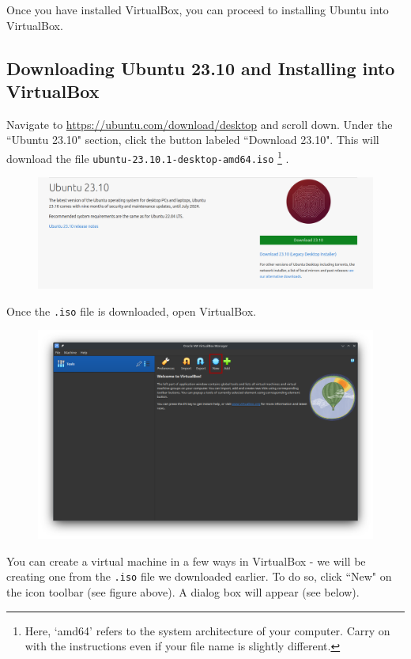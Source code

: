\documentclass[12pt]{article}
\begin{document}
Once you have installed VirtualBox, you can proceed to installing Ubuntu into VirtualBox.

\subsection{Downloading Ubuntu 23.10 and Installing into VirtualBox}

Navigate to \url{https://ubuntu.com/download/desktop} and scroll down. Under the ``Ubuntu 23.10" section, click the button labeled ``Download 23.10". This will download the file \verb|ubuntu-23.10.1-desktop-amd64.iso|  \footnote{Here, `amd64' refers to the system architecture of your computer. Carry on with the instructions even if your file name is slightly different.} .

\begin{figure}[htp]
    \centering
    \includegraphics[width=\textwidth]{1-1.png}
\end{figure}

Once the \verb|.iso| file is downloaded, open VirtualBox.

\begin{figure}[htp]
    \centering
    \includegraphics[width=\textwidth]{1-2.png}
\end{figure}

You can create a virtual machine in a few ways in VirtualBox - we will be creating one from the \verb|.iso| file we downloaded earlier. To do so, click ``New" on the icon toolbar (see figure above). A dialog box will appear (see below). \vspace{5mm}
\end{document}
